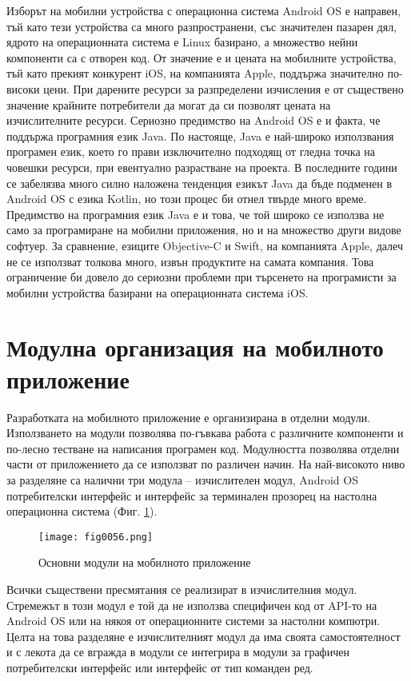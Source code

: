 Изборът на мобилни устройства с операционна система Android OS е направен, тъй като тези устройства са много разпространени, със значителен пазарен дял, ядрото на операционната система е Linux базирано, а множество нейни компоненти са с отворен код. От значение е и цената на мобилните устройства, тъй като прекият конкурент iOS, на компанията Apple, поддържа значително по-високи цени. При дарените ресурси за разпределени изчисления е от съществено значение крайните потребители да могат да си позволят цената на изчислителните ресурси. Сериозно предимство на Android OS е и факта, че поддържа програмния език Java. По настояще, Java е най-широко използвания програмен език, което го прави изключително подходящ от гледна точка на човешки ресурси, при евентуално разрастване на проекта. В последните години се забелязва много силно наложена тенденция езикът Java да бъде подменен в Android OS с езика Kotlin, но този процес би отнел твърде много време. Предимство на програмния език Java е и това, че той широко се използва не само за програмиране на мобилни приложения, но и на множество други видове софтуер. За сравнение, езиците Objective-C и Swift, на компанията Apple, далеч не се използват толкова много, извън продуктите на самата компания. Това ограничение би довело до сериозни проблеми при търсенето на програмисти за мобилни устройства базирани на операционната система iOS. 

\section{Модулна организация на мобилното приложение}

Разработката на мобилното приложение е организирана в отделни модули. Използването на модули позволява по-гъвкава работа с различните компоненти и по-лесно тестване на написания програмен код. Модулността позволява отделни части от приложението да се използват по различен начин. На най-високото ниво за разделяне са налични три модула – изчислителен модул, Android OS потребителски интерфейс и интерфейс за терминален прозорец на настолна операционна система (Фиг. \ref{fig0056}).

\begin{figure}[H]
  \centering
  \texttt{[image: fig0056.png]}
  \caption{Основни модули на мобилното приложение}
\label{fig0056}
\end{figure}

Всички съществени пресмятания се реализират в изчислителния модул. Стремежът в този модул е той да не използва специфичен код от API-то на Android OS или на някоя от операционните системи за настолни компютри. Целта на това разделяне е изчислителният модул да има своята самостоятелност и с лекота да се вгражда в модули се интегрира в модули за графичен потребителски интерфейс или интерфейс от тип команден ред. 

